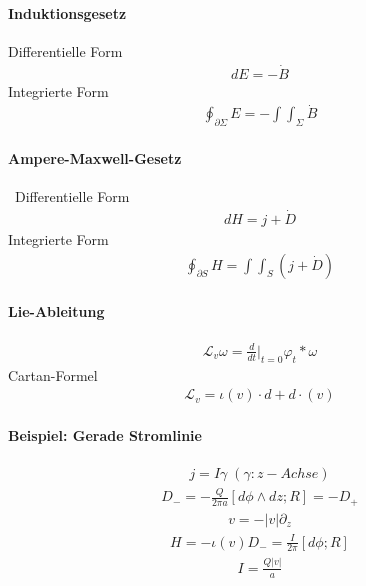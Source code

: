 \documentclass[10pt,a4paper]{article}
\begin{document}
\paragraph{Induktionsgesetz} $\,$ \\
Differentielle Form
\begin{align}
dE=- \dot{B}
\end{align}
Integrierte Form
\begin{align}
\oint_{\partial \Sigma } E = - \int \int_{\Sigma} \dot{B}
\end{align}
\paragraph{Ampere-Maxwell-Gesetz} $\, $
Differentielle Form
\begin{align}
dH= j+ \dot{D}
\end{align}
Integrierte Form
\begin{align}
\oint_{\partial S} H= \int \int_S (j+\dot{D})
\end{align}
\paragraph{Lie-Ableitung}
\begin{align}
\mathcal{L}_v \omega= \frac{d}{dt} \vert_{t=0} \varphi_t* \omega
\end{align}
Cartan-Formel
\begin{align}
\mathcal{L}_v= \iota (v) \cdot d + d \cdot (v)
\end{align}
\paragraph{Beispiel: Gerade Stromlinie} $\, $ \\
\begin{align}
j=I \gamma\; (\gamma: z-Achse)
\end{align}
\begin{align}
D_-= -\frac{Q}{2 \pi a} [d \phi \wedge dz ; R]= -D_+
\end{align}
\begin{align}
v= -\vert v \vert \partial_z
\end{align}
\begin{align}
H=- \iota (v) D_- = \frac{I}{2 \pi} [ d \phi ; R]
\end{align}
\begin{align}
I=\frac{Q \vert v \vert}{a}
\end{align}
\end{document}
